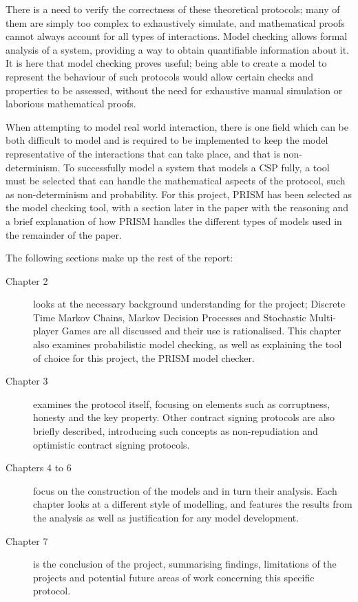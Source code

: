 \documentclass{l4proj}
\begin{document}
There is a need to verify the correctness of these theoretical protocols; many of them are simply too complex to exhaustively simulate, and mathematical proofs cannot always account for all types of interactions. Model checking allows formal analysis of a system, providing a way to obtain quantifiable information about it. It is here that model checking proves useful; being able to create a model to represent the behaviour of such protocols would allow certain checks and properties to be assessed, without the need for exhaustive manual simulation or laborious mathematical proofs.

When attempting to model real world interaction, there is one field which can be both difficult to model and is required to be implemented to keep the model representative of the interactions that can take place, and that is non-determinism. To successfully model a system that models a CSP fully, a tool must be selected that can handle the mathematical aspects of the protocol, such as non-determinism and probability. For this project, PRISM has been selected as the model checking tool, with a section later in the paper with the reasoning and a brief explanation of how PRISM handles the different types of models used in the remainder of the paper.


The following sections make up the rest of the report:
\begin{description}
\item[Chapter 2] looks at the necessary background understanding for the project; Discrete Time Markov Chains, Markov Decision Processes and Stochastic Multi-player Games are all discussed and their use is rationalised. This chapter also examines probabilistic model checking, as well as explaining the tool of choice for this project, the PRISM model checker.

\item[Chapter 3] examines the protocol itself, focusing on elements such as corruptness, honesty and the key property. Other contract signing protocols are also briefly described, introducing such concepts as non-repudiation and optimistic contract signing protocols.

\item[Chapters 4 to 6] focus on the construction of the models and in turn their analysis. Each chapter looks at a different style of modelling, and features the results from the analysis as well as justification for any model development.

\item[Chapter 7] is the conclusion of the project, summarising findings, limitations of the projects and potential future areas of work concerning this specific protocol.
\end{description}
\end{document}
